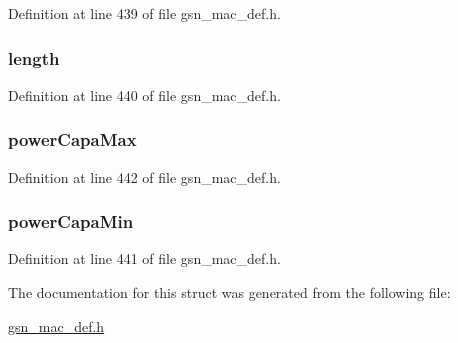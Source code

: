 Definition at line 439 of file gsn\_\-mac\_\-def.h.

\hypertarget{a00122_ae360fb41f422c7c83b87d9af070cbd31}{
\subsubsection[{length}]{ {\bf length}}}
\label{a00122_ae360fb41f422c7c83b87d9af070cbd31}


Definition at line 440 of file gsn\_\-mac\_\-def.h.

\hypertarget{a00122_a789133b7032bc6828b54c3fdd3ce84c0}{
\subsubsection[{powerCapaMax}]{ {\bf powerCapaMax}}}
\label{a00122_a789133b7032bc6828b54c3fdd3ce84c0}


Definition at line 442 of file gsn\_\-mac\_\-def.h.

\hypertarget{a00122_a2dbe867d2b3865e39d436bec0311ef0c}{
\subsubsection[{powerCapaMin}]{ {\bf powerCapaMin}}}
\label{a00122_a2dbe867d2b3865e39d436bec0311ef0c}


Definition at line 441 of file gsn\_\-mac\_\-def.h.



The documentation for this struct was generated from the following file:\begin{DoxyCompactItemize}
\item 
\hyperlink{a00522}{gsn\_\-mac\_\-def.h}\end{DoxyCompactItemize}
